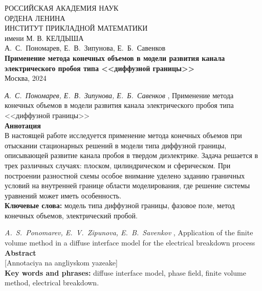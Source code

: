 \documentclass[a4paper,12pt]{article}
\theoremstyle{plain}
\theoremstyle{remark}
\newcommand{\PreprintTitle}{
	Применение метода конечных объемов в модели развития канала электрического пробоя типа <<диффузной границы>>
}
\newcommand{\PreprintTitleEnglish}{
	Application of the finite volume method in a diffuse interface model for the electrical breakdown process
}
\newcommand{\PreprintAuthors}{
	А.~С.~Пономарев, Е.~В.~Зипунова, Е.~Б.~Савенков
}
\newcommand{\PreprintAuthorsEnglish}{
	A.~S.~Ponomarev, E.~V.~Zipunova, E.~B.~Savenkov
}
\begin{document}
\begin{titlepage}

\begin{center}
	РОССИЙСКАЯ АКАДЕМИЯ НАУК \\
	ОРДЕНА ЛЕНИНА \\
	ИНСТИТУТ ПРИКЛАДНОЙ МАТЕМАТИКИ \\
	имени М. В. КЕЛДЫША \\

	\vspace*{60mm}
	\Large{\PreprintAuthors} \\
	\vspace*{20mm}
	\textbf{\large \PreprintTitle} \\
	\vspace*{110mm}
	\Large{Москва, 2024}
	\vspace*{-50mm}
\end{center}

\end{titlepage}

\setcounter{page}{2}

\thispagestyle{empty}

\noindent \emph{\PreprintAuthors}, \PreprintTitle \\[3mm]
\textbf{Аннотация} \\
{
	\small
	В настоящей работе исследуется применение метода конечных объемов при отыскании стационарных решений в модели типа диффузной границы, описывающей развитие канала пробоя в твердом диэлектрике. Задача решается в трех различных случаях: плоском, цилиндрическом и сферическом. При построении разностной схемы особое внимание уделено заданию граничных условий на внутренней границе области моделирования, где решение системы уравнений может иметь особенность. \\[3mm]
	\textbf{Ключевые слова:} модель типа диффузной границы, фазовое поле, метод конечных объемов, электрический пробой. \\[5mm]
}
\begin{otherlanguage}{english}
\emph{\PreprintAuthorsEnglish}, \PreprintTitleEnglish \\[3mm]
\textbf{Abstract} \\
{
	\small
	[Annotaciya na angliyskom yazeake] \\[3mm]
	\textbf{Key words and phrases:} diffuse interface model, phase field, finite volume method, electrical breakdown. \\[5mm]
}
\end{otherlanguage}

\clearpage













\clearpage
\printbibliography

\clearpage
\tableofcontents
\end{document}
